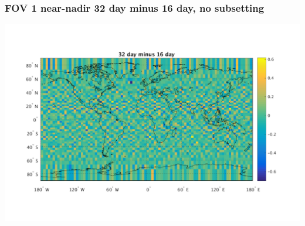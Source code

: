 \documentclass[11pt]{beamer}
\begin{document}
\begin{frame}
\frametitle{FOV 1 near-nadir 32 day minus 16 day, no subsetting}
\begin{center}
  \includegraphics[scale=0.5]{slackfigs/FOV_1_32_minus_16_day_nosub.png}
\end{center}
\end{frame}
% 
% 
% 
% 
% 
% 
\end{document}

